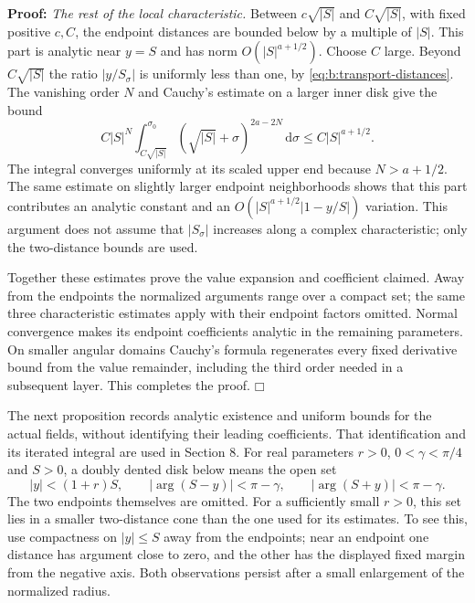 \documentclass[a4paper,10pt]{article}
\numberwithin{equation}{section}
\newcommand{\dd}{\mathrm{d}}
\theoremstyle{paperplain}
\theoremstyle{paperremark}
\theoremstyle{paperplain}
\newenvironment{prf}{\noindent \textbf{Proof: }}{\hfill $\mdlgwhtsquare$\par\addvspace{0.5\baselineskip}}
\begin{document}
\begin{prf}
\smallskip\noindent
\emph{The rest of the local characteristic.}
Between $c\sqrt{|S|}$ and $C\sqrt{|S|}$, with fixed positive
$c,C$, the endpoint distances are bounded below by a multiple of
$|S|$. This part is analytic near $y=S$ and has norm
$O(|S|^{a+1/2})$. Choose $C$ large. Beyond $C\sqrt{|S|}$ the
ratio $|y/S_\sigma|$ is uniformly less than one, by
\eqref{eq:b:transport-distances}. The vanishing order $N$ and
Cauchy's estimate on a larger inner disk give the bound
\begin{equation}\label{eq:b:intermediate-transport}
 C|S|^N\int_{C\sqrt{|S|}}^{\sigma_0}
                    (\sqrt{|S|}+\sigma)^{2a-2N}\,\dd\sigma
                 \leq C|S|^{a+1/2}.
\end{equation}
The integral converges uniformly at its scaled upper end because
$N>a+1/2$. The same estimate on slightly larger endpoint
neighborhoods shows that this part contributes an analytic constant
and an $O(|S|^{a+1/2}|1-y/S|)$ variation.
This argument does not assume that $|S_\sigma|$ increases along a
complex characteristic; only the two-distance bounds are used.

Together these estimates prove the value expansion and coefficient
claimed. Away from the endpoints the normalized arguments range over
a compact set; the same three characteristic estimates apply with
their endpoint factors omitted. Normal convergence makes its endpoint
coefficients analytic
in the remaining parameters. On smaller angular domains Cauchy's
formula regenerates every fixed derivative bound from the value
remainder, including the third order needed in a subsequent layer.
This completes the proof.
\end{prf}

The next proposition records analytic existence and uniform bounds
for the actual fields, without identifying their leading coefficients.
That identification and its iterated integral are used in Section 8.
For real parameters $r>0$, $0<\gamma<\pi/4$ and $S>0$,
a doubly dented disk below means the open set
\begin{equation}\label{eq:b:dented-disk}
 |y|<(1+r)S,\qquad
 |\arg(S-y)|<\pi-\gamma,\qquad
 |\arg(S+y)|<\pi-\gamma.
\end{equation}
The two endpoints themselves are omitted. For a sufficiently small
$r>0$, this set lies in a smaller two-distance cone than
the one used for its estimates. To see this, use compactness on
$|y|\leq S$ away from the endpoints; near an endpoint one distance
has argument close to zero, and the other has the displayed fixed
margin from the negative axis. Both observations persist after a
small enlargement of the normalized radius.
\end{document}
